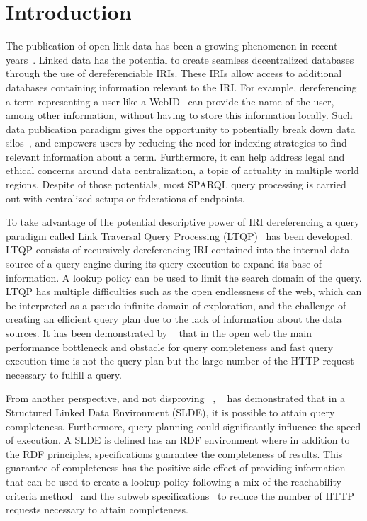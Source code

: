 \section{Introduction}

The publication of open link data has been a growing phenomenon in recent years~\cite{papadaki2018interactive}.
Linked data has the potential to create seamless decentralized databases through the use of dereferenciable IRIs.
These IRIs allow access to additional databases containing information relevant to the IRI.
For example, dereferencing a term representing a user like a WebID~ can provide the name of the user, among other information, without having 
to store this information locally.
Such data publication paradigm gives the opportunity to potentially break down data silos~\cite{verstraete2022solid},
and empowers users by reducing the need for indexing strategies to find relevant information about a term. 
Furthermore,  it can help address legal and ethical concerns around data centralization, a topic of actuality in multiple world regions.
Despite  of those potentials, most SPARQL query processing is carried out with centralized setups or federations of endpoints.

To take advantage of the potential descriptive power of IRI dereferencing a query paradigm called Link Traversal Query Processing (LTQP)~\cite{Hartig2012} has been developed.
LTQP consists of recursively dereferencing IRI contained into the internal data source of a query engine during its query execution to expand its base of information.
A lookup policy can be used to limit the search domain of the query.
LTQP has multiple difficulties such as the open endlessness of the web, which can be interpreted as a pseudo-infinite domain of exploration,
and the challenge of creating an efficient query plan due to the lack of information about the data sources. 
It has been demonstrated by ~\citeauthor{hartig2016walking} that in the open web the main performance bottleneck and obstacle for query completeness and fast query execution time is not the query plan but the large number of the HTTP request necessary to fulfill a query.

From another perspective, and not disproving ~\citeauthor{hartig2016walking}, 
~\citeauthor{Taelman2023} has demonstrated that in a Structured Linked Data Environment (SLDE),
it is possible to attain query completeness.
Furthermore, query planning could significantly influence the speed of execution.
A SLDE is defined has an RDF environment where in addition to the RDF principles, specifications
guarantee the completeness of results.
This guarantee of completeness has the positive side effect of providing information
that can be used to create a lookup policy following a mix of the reachability criteria method~\cite{Hartig2012, Taelman2023} and the subweb specifications~\cite{Bogaerts2021LinkTW}
to reduce the number of HTTP requests necessary to attain completeness.

